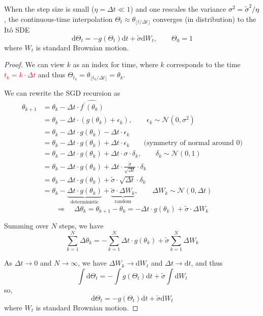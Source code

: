 \documentclass[10pt, headings=standardclasses, parskip=half, twoside]{scrartcl}
\begin{document}
\begin{theorem}\label{thm:SGD_to_SDE}
When the step size is small ($\eta=\Delta t \ll 1$) and one rescales the variance \textcolor{black}{$\sigma^2= \tilde{\sigma}^2 / \eta$}, the continuous-time interpolation $\Theta_t \approx \theta_{\lfloor t / \Delta t\rfloor}$ converges (in distribution) to the Itô SDE
$$
\mathrm{d} \Theta_t=-g\left(\Theta_t\right) \mathrm{d} t+\tilde{\sigma} \mathrm{d} W_t, \qquad \Theta_0=1
$$
where $W_t$ is standard Brownian motion. 
\end{theorem}
\begin{proof}
We can view \(k\) as an index for time, where \(k\) corresponds to the time \textcolor{red}{\(t_k = k \cdot \Delta t\)} and thus \(\Theta_{t_k} = \theta_{\lfloor t_k / \Delta t \rfloor} = \theta_k\).

We can rewrite the SGD recursion as
\[
\begin{aligned}
\theta_{k+1} 
&= \theta_k - \Delta t \cdot \widehat{f^{\prime}\left(\theta_k\right)} \\
&= \theta_k - \Delta t \cdot (g(\theta_k) + \epsilon_k), \qquad \epsilon_k \sim \mathcal{N}(0, \sigma^2) \\
&= \theta_k - \Delta t \cdot g(\theta_k) - \Delta t \cdot \epsilon_k \\
&= \theta_k - \Delta t \cdot g(\theta_k) + \Delta t \cdot \epsilon_k \qquad \text{(symmetry of normal around 0)} \\
&= \theta_k - {\Delta t \cdot g(\theta_k)} + {\Delta t \cdot \sigma \cdot  \delta_k}, \qquad \delta_k \sim \mathcal{N}(0,1) \\
&= \theta_k - \Delta t \cdot g(\theta_k) +  \Delta t \cdot {\textstyle \frac{\tilde{\sigma}}{\sqrt{\Delta t}}} \cdot  \delta_k \\
&= \theta_k - \Delta t \cdot g(\theta_k) + \tilde{\sigma} \cdot {\sqrt{\Delta t} \cdot  \delta_k} \\
&= \theta_k - \underbrace{\Delta t \cdot g(\theta_k)}_{\text{deterministic}} + \underbrace{\tilde{\sigma} \cdot \Delta W_k}_{\text{random}}, \qquad \Delta W_k
\sim \mathcal{N}(0, \Delta t)
\end{aligned}
\] 
\[
\Longrightarrow \quad 
\boxed{
\Delta \theta_k = \theta_{k+1} - \theta_k = -\Delta t \cdot g(\theta_k) + \tilde{\sigma} \cdot \Delta W_k
}
\]

Summing over \(N\) steps, we have
\[
\sum_{k=1}^{N} \Delta \theta_k
= -\sum_{k=1}^{N} \Delta t \cdot g(\theta_k) + \tilde{\sigma} \sum_{k=1}^{N} \Delta W_k
\]

As \(\Delta t \to 0\) and \(N \to \infty\), we have
\(\Delta W_k \to \mathrm{d} W_t\) and \(\Delta t \to \mathrm{d} t\), and thus 
\[
\int \mathrm{d} \Theta_t = -\int g(\Theta_t) \mathrm{d} t + \tilde{\sigma} \int \mathrm{d} W_t
\]
so,
\[
 \mathrm{d} \Theta_t = -g(\Theta_t) \mathrm{d} t + \tilde{\sigma} \mathrm{d} W_t
\]
where \(W_t\) is standard Brownian motion.
\end{proof}
\end{document}
